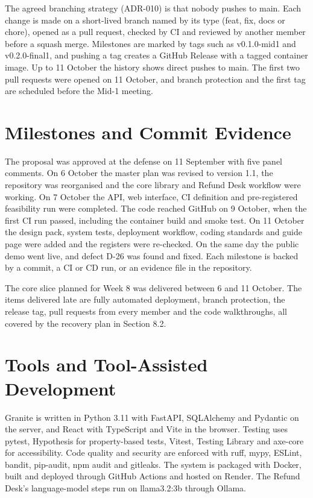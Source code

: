 The agreed branching strategy (ADR-010) is that nobody pushes to main. Each change is made on a short-lived branch named by its type (feat, fix, docs or chore), opened as a pull request, checked by CI and reviewed by another member before a squash merge. Milestones are marked by tags such as v0.1.0-mid1 and v0.2.0-final1, and pushing a tag creates a GitHub Release with a tagged container image. Up to 11 October the history shows direct pushes to main. The first two pull requests were opened on 11 October, and branch protection and the first tag are scheduled before the Mid-1 meeting.

\section{Milestones and Commit Evidence}

The proposal was approved at the defense on 11 September with five panel comments. On 6 October the master plan was revised to version 1.1, the repository was reorganised and the core library and Refund Desk workflow were working. On 7 October the API, web interface, CI definition and pre-registered feasibility run were completed. The code reached GitHub on 9 October, when the first CI run passed, including the container build and smoke test. On 11 October the design pack, system tests, deployment workflow, coding standards and guide page were added and the registers were re-checked. On the same day the public demo went live, and defect D-26 was found and fixed. Each milestone is backed by a commit, a CI or CD run, or an evidence file in the repository.

The core slice planned for Week 8 was delivered between 6 and 11 October. The items delivered late are fully automated deployment, branch protection, the release tag, pull requests from every member and the code walkthroughs, all covered by the recovery plan in Section 8.2.

\section{Tools and Tool-Assisted Development}

Granite is written in Python 3.11 with FastAPI, SQLAlchemy and Pydantic on the server, and React with TypeScript and Vite in the browser. Testing uses pytest, Hypothesis for property-based tests, Vitest, Testing Library and axe-core for accessibility. Code quality and security are enforced with ruff, mypy, ESLint, bandit, pip-audit, npm audit and gitleaks. The system is packaged with Docker, built and deployed through GitHub Actions and hosted on Render. The Refund Desk's language-model steps run on llama3.2:3b through Ollama.


